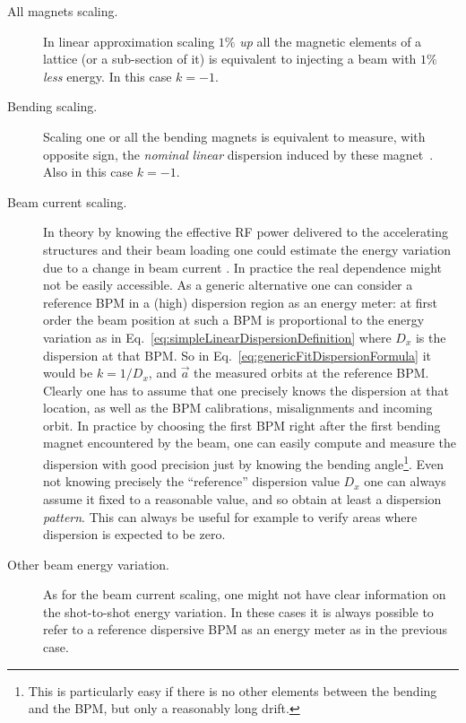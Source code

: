 \begin{description}
\item[All magnets scaling.] In linear approximation scaling  $1\%$ \emph{up} all the
magnetic elements of a lattice (or a sub-section of it) is equivalent to injecting a beam
with $1\%$ \emph{less} energy. In this case $k = -1$.
\item[Bending scaling.] Scaling one or all the
bending magnets is equivalent to measure, with opposite sign, the \emph{nominal}
\emph{linear} dispersion induced by these magnet~\cite{bib:DavideThesis}. 
Also in this case $k = -1$.
\item[Beam current scaling.] In theory by knowing the effective RF power delivered to the
accelerating structures and their beam loading one could estimate the energy variation due
to a change in beam current \cite{bib:CTF3DesignReport}.
In practice the real dependence might not be easily accessible.
As a generic alternative one can consider a reference BPM in a (high) dispersion region as
an energy meter:
at first order the beam position at such a BPM is proportional to the energy variation as
in Eq.~\ref{eq:simpleLinearDispersionDefinition} where $D_x$ is the dispersion at that
BPM.
So in Eq.~\ref{eq:genericFitDispersionFormula} it would be $k = 1/D_x$, and $\vec{a}$ the
measured orbits at the reference BPM.
Clearly one has to assume that one precisely knows the dispersion at that location, as
well as the BPM calibrations, misalignments and incoming orbit.
In practice by choosing the first BPM right after the first bending magnet encountered by
the beam, one can easily compute and measure the dispersion with good precision just by
knowing the bending angle\footnote{This is particularly easy if there is no other elements
between the bending and the BPM, but only a reasonably long drift.}. 
Even not knowing precisely the ``reference'' dispersion value $D_x$ one can always assume
it fixed to a reasonable value, and so obtain at least a dispersion \emph{pattern}. This
can always be useful for example to verify areas where dispersion is expected to be zero.
\item[Other beam energy variation.]
As for the beam current scaling, one might not have clear information on the shot-to-shot
energy variation. In these cases it is always possible to refer to a reference dispersive
BPM as an energy meter as in the previous case.
\end{description}

